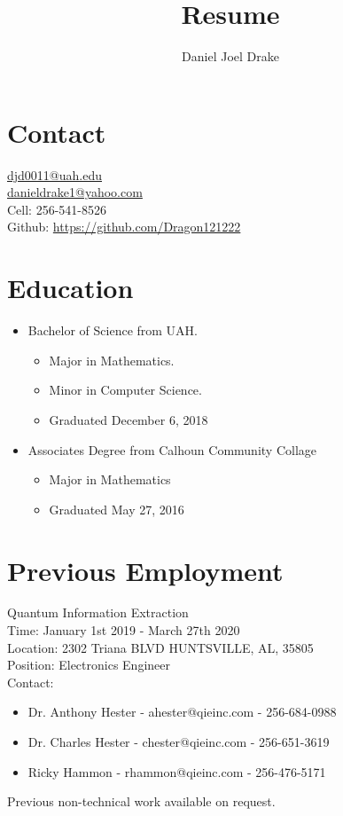 \documentclass[10pt]{extarticle}
\title{
	Resume \\
}
\author{Daniel Joel Drake}
\theoremstyle{plain}
\theoremstyle{Definition}
\theoremstyle{Definition}
\theoremstyle{plain}
\begin{document}
	\twocolumn
	\maketitle		
	\noindent
	\section{Contact}
	\href{mailto:djd0011@uah.edu}{djd0011@uah.edu}  \\
	\href{mailto:danieldrake1@yahoo.com}{danieldrake1@yahoo.com}  \\
	Cell: 256-541-8526  \\
	Github: \href{https://github.com/Dragon121222}{https://github.com/Dragon121222} 
	\section{Education}
		\begin{itemize}
			\item Bachelor of Science from UAH.
			\begin{itemize}
				\item Major in Mathematics.
				\item Minor in Computer Science.
				\item Graduated December 6, 2018
		\end{itemize}
			\item Associates Degree from Calhoun Community Collage
			\begin{itemize}
				\item Major in Mathematics
				\item Graduated May 27, 2016
			\end{itemize}
		\end{itemize}
	\section{Previous Employment}
		Quantum Information Extraction \\
		Time: January 1st 2019 - March 27th 2020 \\ 
		Location: 2302 Triana BLVD HUNTSVILLE, AL, 35805 \\
		Position: Electronics Engineer \\	 
		Contact: 
		\begin{itemize}
			\item Dr. Anthony Hester - ahester@qieinc.com - 256-684-0988
			\item Dr. Charles Hester - chester@qieinc.com - 256-651-3619
			\item Ricky Hammon - rhammon@qieinc.com - 256-476-5171
		\end{itemize}	
	Previous non-technical work available on request. 
\end{document}

